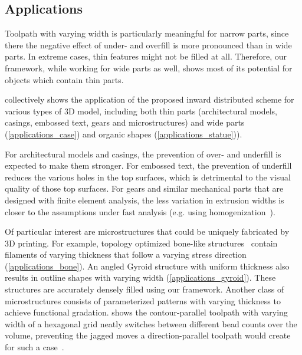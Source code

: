 \subsection{Applications}
Toolpath with varying width is particularly meaningful for narrow parts, since there the negative effect of under- and overfill is more pronounced than in wide parts.
In extreme cases, thin features might not be filled at all.
Therefore, our framework, while working for wide parts as well, shows most of its potential for objects which contain thin parts.

 collectively shows the application of the proposed inward distributed scheme for various types of 3D model, including both thin parts (architectural models, casings, embossed text, gears and microstructures) and wide parts (\cref{applications_case}) and organic shapes (\cref{applications_statue})).

For architectural models and casings, the prevention of over- and underfill is expected to make them stronger. 
For embossed text, the prevention of underfill reduces the various holes in the top surfaces, which is detrimental to the visual quality of those top surfaces.
For gears and similar mechanical parts that are designed with finite element analysis, the less variation in extrusion widths is closer to the assumptions under fast analysis (e.g. using homogenization~\cite{Liu2016CAD}).

Of particular interest are microstructures that could be uniquely fabricated by 3D printing.
For example, topology optimized bone-like structures~\cite{wu2017infill} contain filaments of varying thickness that follow a varying stress direction (\cref{applications_bone}).
An angled Gyroid structure with uniform thickness also results in outline shapes with varying width (\cref{applications_gyroid}). 
These structures are accurately densely filled using our framework.
Another class of microstructures consists of parameterized patterns with varying thickness to achieve functional gradation.
 shows the contour-parallel toolpath with varying width of a hexagonal grid neatly switches between different bead counts over the volume, preventing the jagged moves a direction-parallel toolpath would create for such a case~\cite{bates2018compressive}.


